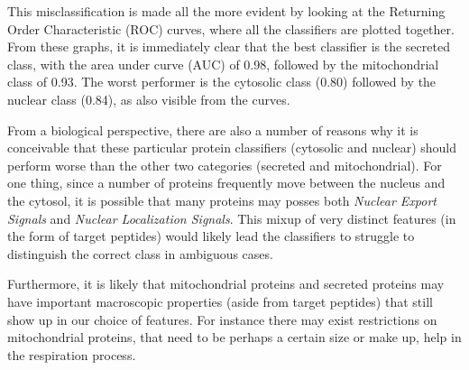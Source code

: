 \documentclass{bioinfo}
\begin{document}
This misclassification is made all the more evident by looking at the Returning Order Characteristic (ROC) curves, where all the classifiers are plotted together. 
From these graphs, it is immediately clear that the best classifier is the secreted class, with the area under curve (AUC) of 0.98, followed by the mitochondrial class of 0.93. The worst performer is the cytosolic class (0.80) followed by the nuclear class (0.84), as also visible from the curves.

From a biological perspective, there are also a number of reasons why it is conceivable that these particular protein classifiers (cytosolic and nuclear) should perform worse than the other two categories (secreted and mitochondrial). 
For one thing, since a number of proteins frequently move between the nucleus and the cytosol, it is possible that many proteins may posses both \textit{Nuclear Export Signals} and \textit{Nuclear Localization Signals}. 
This mixup of very distinct features (in the form of target peptides) would likely lead the classifiers to struggle to distinguish the correct class in ambiguous cases.

Furthermore, it is likely that mitochondrial proteins and secreted proteins may have important macroscopic properties (aside from target peptides) that still show up in our choice of features.
For instance there may exist restrictions on mitochondrial proteins, that need to be perhaps a certain size or make up, help in the respiration process.




\end{document}
